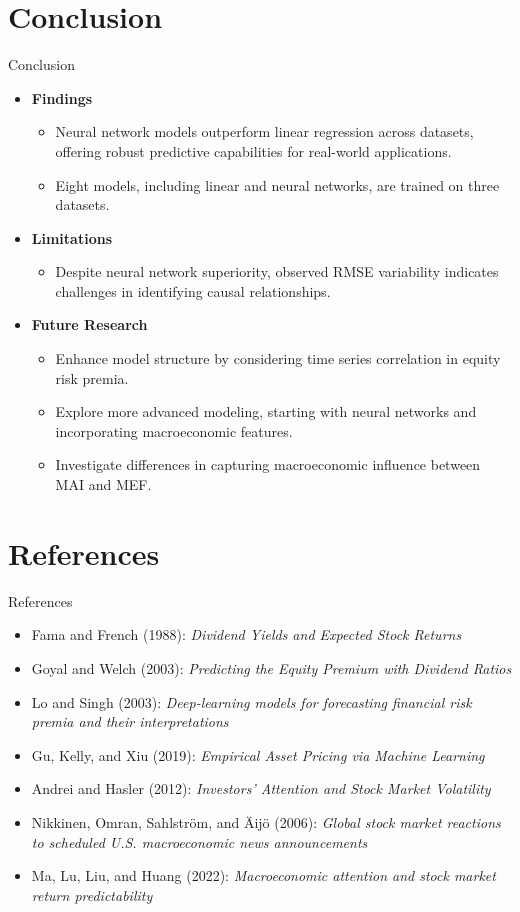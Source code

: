\documentclass{beamer}
\begin{document}
\section{Conclusion}
\begin{frame}{Conclusion}
  \begin{itemize}
    \item \textbf{Findings}
    \begin{itemize}
        \item Neural network models outperform linear regression across datasets, offering robust predictive capabilities for real-world applications.
        \item Eight models, including linear and neural networks, are trained on three datasets.
    \end{itemize}     
    \item \textbf{Limitations} 
    \begin{itemize}
        \item Despite neural network superiority, observed RMSE variability indicates challenges in identifying causal relationships.
    \end{itemize}
    \item \textbf{Future Research}
      \begin{itemize}
        \item Enhance model structure by considering time series correlation in equity risk premia.
        \item Explore more advanced modeling, starting with neural networks and incorporating macroeconomic features.
        \item Investigate differences in capturing macroeconomic influence between MAI and MEF.
      \end{itemize}
  \end{itemize}
\end{frame}

\section{References}
\begin{frame}{References}
  \begin{itemize}
    \item Fama and French (1988): \emph{Dividend Yields and Expected Stock Returns}
    \item Goyal and Welch (2003): \emph{Predicting the Equity Premium with Dividend Ratios}
    \item Lo and Singh (2003): \emph{Deep-learning models for forecasting financial risk premia and their interpretations}
    \item Gu, Kelly, and Xiu (2019): \emph{Empirical Asset Pricing via Machine Learning}
    \item Andrei and Hasler (2012): \emph{Investors’ Attention and Stock Market Volatility}
    \item Nikkinen, Omran, Sahlström, and Äijö (2006): \emph{Global stock market reactions to scheduled U.S. macroeconomic news announcements}
    \item Ma, Lu, Liu, and Huang (2022): \emph{Macroeconomic attention and stock market return predictability}
  \end{itemize}
\end{frame}
\end{document}
